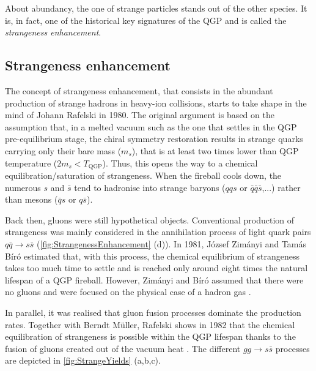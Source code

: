 About abundancy, the one of strange particles stands out of the other species. It is, in fact, one of the historical key signatures of the QGP and is called the \textit{strangeness enhancement}. 

\subsection{Strangeness enhancement}
\label{subsec:StrangenessEnhanement}

The concept of strangeness enhancement, that consists in the abundant production of strange hadrons in heavy-ion collisions, starts to take shape in the mind of Johann Rafelski in 1980. The original argument is based on the assumption that, in a melted vacuum such as the one that settles in the QGP pre-equilibrium stage, the chiral symmetry restoration results in strange quarks carrying only their bare mass ($m_{s}$), that is at least two times lower than QGP temperature ($2 m_{s} < T_{\textrm{QGP}}$). Thus, this opens the way to a chemical equilibration/saturation of strangeness. When the fireball cools down, the numerous $s$ and $\bar{s}$ tend to hadronise into strange baryons ($qqs$ or $\bar{q}\bar{q}\bar{s}$,...) rather than mesons ($\bar{q}s$ or $q\bar{s}$).

Back then, gluons were still hypothetical objects. Conventional production of strangeness was mainly considered in the annihilation process of light quark pairs $q\bar{q} \rightarrow s \bar{s}$ (\fig \ref{fig:StrangenessEnhancement} (d)). In 1981, J\'ozsef Zim\'anyi and Tam\'as B\'ir\'o estimated that, with this process, the chemical equilibrium of strangeness takes too much time to settle and is reached only around eight times the natural lifespan of a QGP fireball. However, Zim\'anyi and B\'ir\'o assumed that there were no gluons and were focused on the physical case of a hadron gas \cite{rafelskiStrangenessEnhancement2008}.

In parallel, it was realised that gluon fusion processes dominate the production rates. Together with Berndt M\"{u}ller, Rafelski shows in 1982 that the chemical equilibration of strangeness is possible within the QGP lifespan thanks to the fusion of gluons created out of the vacuum heat  \cite{rafelskiStrangenessProductionQuarkGluon1982}. The different $gg \rightarrow s\bar{s}$ processes are depicted in \fig\ref{fig:StrangeYields} (a,b,c).



